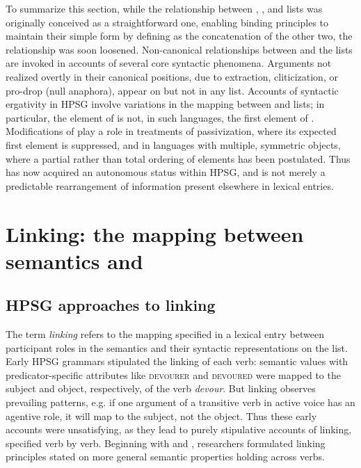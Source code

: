 \documentclass[output=paper]{langsci/langscibook}
\begin{document}
To summarize this section, while the relationship between \argst, \subj, and \comps lists was originally conceived as a straightforward one, enabling binding principles to maintain their simple form by defining \argst as the concatenation of the other two, the relationship was soon loosened.
Non-canonical relationships between \argst and the \val lists are invoked in accounts of several core syntactic phenomena.
Arguments not realized overtly in their canonical positions, due to extraction, cliticization, or pro-drop (null anaphora), appear on \argst but not in any \val list.
Accounts of syntactic ergativity in HPSG involve variations in the mapping between \argst and \val lists; in particular, the element of \subj is not, in such languages, the first element of \argst.
Modifications of \argst play a role in treatments of passivization, where its expected first element is suppressed, and in languages with multiple, symmetric objects, where a partial rather than total ordering of \argst elements has been postulated.
Thus \argst has now acquired an autonomous %
status within HPSG, and is not merely a predictable rearrangement of information present elsewhere in lexical entries.


\section{Linking: the mapping between semantics and \argst}
\label{linking-sec}


\subsection{HPSG approaches to linking}

The term \textit{linking} refers to the mapping specified in a lexical entry between participant roles in the semantics and their syntactic representations on the \argst list.  
Early HPSG grammars stipulated the linking of each verb:  semantic \content values with predicator-specific attributes like \textsc{devourer} and \textsc{devoured} were mapped to the subject and object, respectively, of the verb \textit{devour}.  But linking observes prevailing patterns, e.g. if one argument of a transitive verb in active voice has an agentive role, it will map to the subject, not the object.
Thus these early accounts were unsatisfying, as they lead to purely stipulative accounts of linking, specified verb by verb.
Beginning with \citet{Wechsler1995b} and \citet{Davis1996}, researchers formulated linking principles stated on more general semantic properties holding across verbs.  
\end{document}
